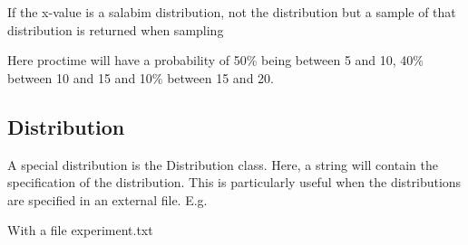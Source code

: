\documentclass[letterpaper,10pt,english]{sphinxmanual}
\begin{document}
If the x-value is a salabim distribution, not the distribution but a sample of that distribution is returned when sampling

\begin{sphinxVerbatim}[commandchars=\\\{\}]
          
\end{sphinxVerbatim}

Here proctime will have a probability of 50\% being between 5 and 10, 40\% between 10 and 15 and 10\% between 15 and 20.


\subsection{Distribution}
\label{\detokenize{Distributions:distribution}}
A special distribution is the Distribution class. Here, a string will contain the specification of the distribution.
This is particularly useful when the distributions are specified in an external file. E.g.

\begin{sphinxVerbatim}[commandchars=\\\{\}]
    
      
      
      
\end{sphinxVerbatim}

With a file experiment.txt
\end{document}
